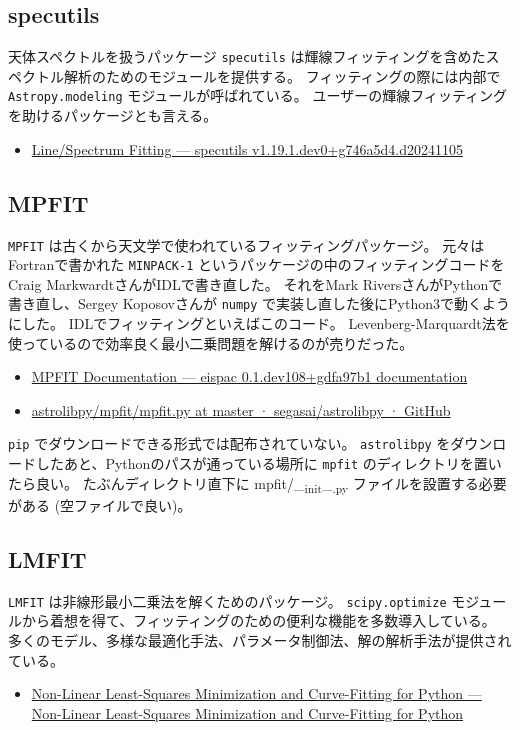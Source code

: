 \documentclass[a4paper, 8pt, notitlepage, uplatex, dvipdfmx]{jsarticle}
\begin{document}
\subsection{specutils}
\label{sec:orgfc40bd3}
天体スペクトルを扱うパッケージ \texttt{specutils} は輝線フィッティングを含めたスペクトル解析のためのモジュールを提供する。
フィッティングの際には内部で \texttt{Astropy.modeling} モジュールが呼ばれている。
ユーザーの輝線フィッティングを助けるパッケージとも言える。
\begin{itemize}
\item \href{https://specutils.readthedocs.io/en/stable/fitting.html}{Line/Spectrum Fitting — specutils v1.19.1.dev0+g746a5d4.d20241105}
\end{itemize}
\subsection{MPFIT}
\label{sec:orgcf29e1f}
\texttt{MPFIT} は古くから天文学で使われているフィッティングパッケージ。
元々はFortranで書かれた \texttt{MINPACK-1} というパッケージの中のフィッティングコードをCraig MarkwardtさんがIDLで書き直した。
それをMark RiversさんがPythonで書き直し、Sergey Koposovさんが \texttt{numpy} で実装し直した後にPython3で動くようにした。
IDLでフィッティングといえばこのコード。
Levenberg-Marquardt法を使っているので効率良く最小二乗問題を解けるのが売りだった。
\begin{itemize}
\item \href{https://eispac.readthedocs.io/en/stable/guide/07-mpfit\_docs.html}{MPFIT Documentation — eispac 0.1.dev108+gdfa97b1 documentation}
\item \href{https://github.com/segasai/astrolibpy/blob/master/mpfit/mpfit.py}{astrolibpy/mpfit/mpfit.py at master · segasai/astrolibpy · GitHub}
\end{itemize}

\texttt{pip} でダウンロードできる形式では配布されていない。
\texttt{astrolibpy} をダウンロードしたあと、Pythonのパスが通っている場所に \texttt{mpfit} のディレクトリを置いたら良い。
たぶんディレクトリ直下に mpfit/\_\textsubscript{init}\_\textsubscript{.py} ファイルを設置する必要がある (空ファイルで良い)。
\subsection{LMFIT}
\label{sec:org5f35a31}
\texttt{LMFIT} は非線形最小二乗法を解くためのパッケージ。
\texttt{scipy.optimize} モジュールから着想を得て、フィッティングのための便利な機能を多数導入している。
多くのモデル、多様な最適化手法、パラメータ制御法、解の解析手法が提供されている。
\begin{itemize}
\item \href{https://lmfit.github.io/lmfit-py/index.html}{Non-Linear Least-Squares Minimization and Curve-Fitting for Python — Non-Linear Least-Squares Minimization and Curve-Fitting for Python}
\end{itemize}
\end{document}
